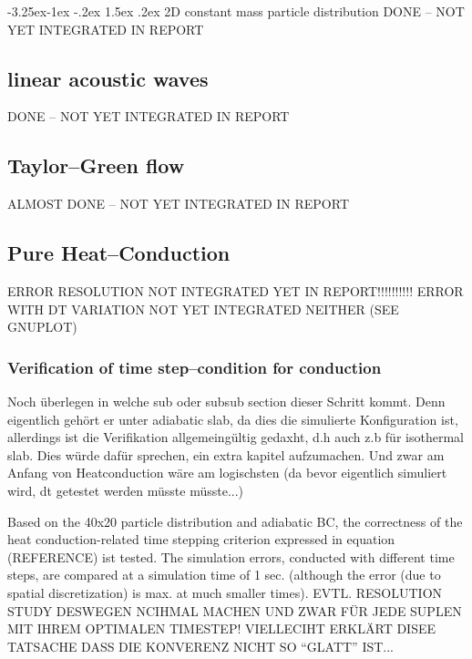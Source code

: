 \documentclass{report}
\makeatletter
\renewcommand\paragraph{\@startsection{paragraph}{4}{\z@}%
  {-3.25ex\@plus -1ex \@minus -.2ex}%
  {1.5ex \@plus .2ex}%
  {\normalfont\normalsize\bfseries}}
\makeatother
\begin{document}
\paragraph{2D constant mass particle distribution}
DONE -- NOT YET INTEGRATED IN REPORT
\subsection{linear acoustic waves}

DONE -- NOT YET INTEGRATED IN REPORT


\subsection{Taylor--Green flow}
ALMOST DONE -- NOT YET INTEGRATED IN REPORT

\subsection{Pure Heat--Conduction}

ERROR RESOLUTION NOT INTEGRATED YET IN REPORT!!!!!!!!!!
ERROR WITH DT VARIATION NOT YET INTEGRATED NEITHER (SEE GNUPLOT)

\subsubsection{Verification of time step--condition for conduction}
Noch überlegen in welche sub oder subsub section dieser Schritt kommt.
Denn eigentlich gehört er unter adiabatic slab, da dies die simulierte Konfiguration ist, allerdings ist die Verifikation allgemeingültig gedaxht, d.h auch z.b für isothermal slab. Dies würde dafür sprechen, ein extra kapitel aufzumachen. Und zwar am Anfang von Heatconduction wäre am logischsten (da bevor eigentlich simuliert wird, dt getestet werden müsste müsste...)

Based on the 40x20 particle distribution and adiabatic BC, the correctness of the
heat conduction-related time stepping criterion expressed in equation (REFERENCE) ist tested. The simulation errors, conducted with different time steps, are compared at a simulation time of 1 sec. (although the error (due to spatial discretization) is max. at much smaller times). 
EVTL. RESOLUTION STUDY DESWEGEN NCIHMAL MACHEN UND ZWAR FÜR JEDE SUPLEN MIT IHREM OPTIMALEN TIMESTEP! VIELLECIHT ERKLÄRT DISEE TATSACHE DASS DIE KONVERENZ NICHT SO ``GLATT'' IST...
\end{document}
